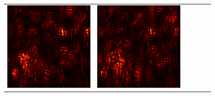 \documentclass[preprint,12pt]{elsarticle}
\begin{document}
\begin{figure}[p]
\begin{tabular}{cccccc}
  \includegraphics[scale=\scale]{../visualizations/examples/imagenette/cnn/positive_saliency_map/7.png} & 
  \includegraphics[scale=\scale]{../visualizations/examples/imagenette/cnn/negative_saliency_map/7.png} & 

\end{tabular}
\end{figure}
\end{document}
